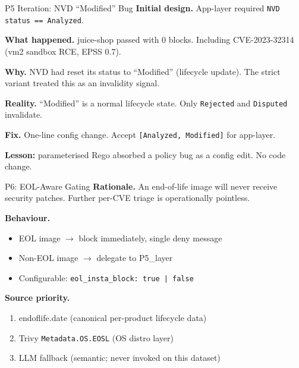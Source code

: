 \documentclass[aspectratio=169]{beamer}
\begin{document}
\begin{frame}{P5 Iteration: NVD ``Modified'' Bug}
\textbf{Initial design.} App-layer required \texttt{NVD status == Analyzed}.

\medskip
\textbf{What happened.} juice-shop passed with 0 blocks. Including CVE-2023-32314 (vm2 sandbox RCE, EPSS 0.7).

\medskip
\textbf{Why.} NVD had reset its status to ``Modified'' (lifecycle update). The strict variant treated this as an invalidity signal.

\medskip
\textbf{Reality.} ``Modified'' is a normal lifecycle state. Only \texttt{Rejected} and \texttt{Disputed} invalidate.

\medskip
\textbf{Fix.} One-line config change. Accept \texttt{[Analyzed, Modified]} for app-layer.

\medskip
\textcolor{accent}{\textbf{Lesson:} parameterised Rego absorbed a policy bug as a config edit. No code change.}
\end{frame}

\begin{frame}{P6: EOL-Aware Gating}
\textbf{Rationale.} An end-of-life image will never receive security patches. Further per-CVE triage is operationally pointless.

\medskip
\textbf{Behaviour.}
\begin{itemize}
  \item EOL image $\to$ block immediately, single deny message
  \item Non-EOL image $\to$ delegate to P5\_layer
  \item Configurable: \texttt{eol\_insta\_block: true | false}
\end{itemize}

\medskip
\textbf{Source priority.}
\begin{enumerate}
  \item endoflife.date (canonical per-product lifecycle data)
  \item Trivy \texttt{Metadata.OS.EOSL} (OS distro layer)
  \item LLM fallback (semantic; never invoked on this dataset)
\end{enumerate}
\end{frame}
\end{document}
